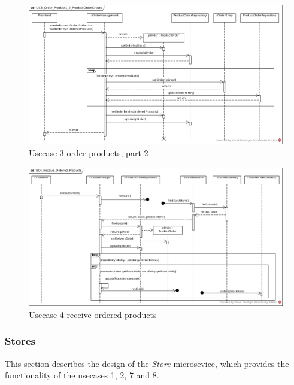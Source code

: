 			\begin{figure}[!h]
				\centering
				\includegraphics[width = 1\textwidth]{img/UC3_Order_Products_2_ProductOrderCreate.jpg}
				\caption{Usecase 3 order products, part 2}
				\label{MS_UC3_2}
			\end{figure}
		
			
			\begin{figure}[!h]
				\centering
				\includegraphics[width = 1\textwidth]{img/UC4_Receive_Ordered_Products.jpg}
				\caption{Usecase 4 receive ordered products}
				\label{MS_UC4}
			\end{figure}
			
		\FloatBarrier
			
		\subsubsection{Stores}
		This section describes the design of the \textit{Store} microsevice, which provides the functionality of the usecases 1, 2, 7 and 8.
		
